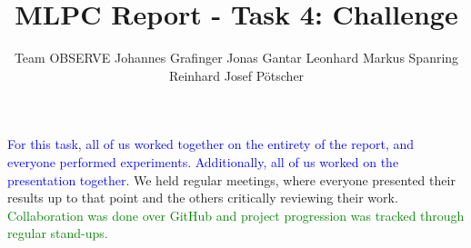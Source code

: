 \documentclass{article}
\title{MLPC Report  - Task 4: Challenge}
\author{
  Team OBSERVE \AND
  Johannes Grafinger 
  \And
  Jonas Gantar 
  \And 
  Leonhard Markus Spanring 
  \And 
  Reinhard Josef Pötscher
}
\begin{document}
\maketitle

\begin{contributions}
  \textcolor{blue}{For this task, all of us worked together on the entirety of the report, and everyone performed experiments. Additionally, all of us worked on the presentation together.} We held regular meetings, where everyone presented their results up to that point and the others critically reviewing their work.
  \textcolor{green}{Collaboration was done over GitHub and project progression was tracked through regular stand-ups.} 
  
\end{contributions}


\newpage


\newpage


\newpage


\newpage


\end{document}
